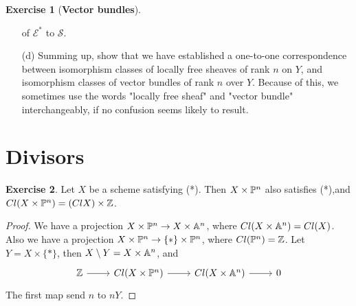 \documentclass[11pt]{book}
\theoremstyle{definition}
\newtheorem{exercise}{Exercise}[section]
\begin{document}
\begin{exercise}[\textbf{Vector bundles}]
\begin{itemize}
of $\mathscr{E}^*$ to $\mathscr{S}$.
\item[(d)] Summing up, show that we have established a one-to-one correspondence between isomorphism classes of locally free sheaves of rank $n$ on $Y$, and isomorphism classes of vector bundles of rank $n$ over $Y$. Because of this, we sometimes use the words "locally free sheaf" and "vector bundle" interchangeably, if no confusion seems likely to result.
\end{itemize}
\end{exercise}
\section{Divisors}
\begin{exercise}
Let $X$ be a scheme satisfying (*). Then $X\times\P^n$ also satisfies (*),and $Cl(X\times\P^n)=(Cl X)\times\Z$.
\end{exercise}
\begin{proof}
We have a projection $X\times\P^n\to X\times\A^n$, where $Cl(X\times\A^n)=Cl(X)$. Also we have a projection $X\times\P^n\to\{*\}\times\P^n$, where $Cl(\P^n)=\Z$. Let $Y=X\times\{*\}$, then $X\setminus Y=X\times\A^n$, and
\[\begin{tikzcd}
\Z\ar[r]&Cl(X\times\P^n)\ar[r]&Cl(X\times\A^n)\ar[r]&0
\end{tikzcd}\]
The first map send $n$ to $nY$. 
\end{proof}
\end{document}
